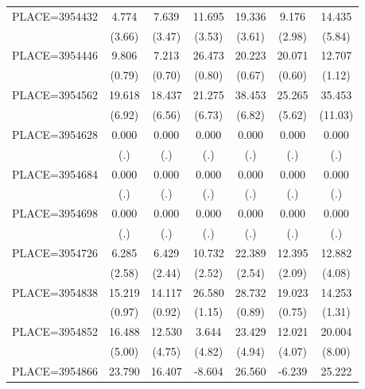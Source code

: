 {\begin{tabular}{l*{6}{c}}
PLACE=3954432       &       4.774&       7.639&      11.695&      19.336&       9.176&      14.435\\
                    &      (3.66)&      (3.47)&      (3.53)&      (3.61)&      (2.98)&      (5.84)\\
PLACE=3954446       &       9.806&       7.213&      26.473&      20.223&      20.071&      12.707\\
                    &      (0.79)&      (0.70)&      (0.80)&      (0.67)&      (0.60)&      (1.12)\\
PLACE=3954562       &      19.618&      18.437&      21.275&      38.453&      25.265&      35.453\\
                    &      (6.92)&      (6.56)&      (6.73)&      (6.82)&      (5.62)&     (11.03)\\
PLACE=3954628       &       0.000&       0.000&       0.000&       0.000&       0.000&       0.000\\
                    &         (.)&         (.)&         (.)&         (.)&         (.)&         (.)\\
PLACE=3954684       &       0.000&       0.000&       0.000&       0.000&       0.000&       0.000\\
                    &         (.)&         (.)&         (.)&         (.)&         (.)&         (.)\\
PLACE=3954698       &       0.000&       0.000&       0.000&       0.000&       0.000&       0.000\\
                    &         (.)&         (.)&         (.)&         (.)&         (.)&         (.)\\
PLACE=3954726       &       6.285&       6.429&      10.732&      22.389&      12.395&      12.882\\
                    &      (2.58)&      (2.44)&      (2.52)&      (2.54)&      (2.09)&      (4.08)\\
PLACE=3954838       &      15.219&      14.117&      26.580&      28.732&      19.023&      14.253\\
                    &      (0.97)&      (0.92)&      (1.15)&      (0.89)&      (0.75)&      (1.31)\\
PLACE=3954852       &      16.488&      12.530&       3.644&      23.429&      12.021&      20.004\\
                    &      (5.00)&      (4.75)&      (4.82)&      (4.94)&      (4.07)&      (8.00)\\
PLACE=3954866       &      23.790&      16.407&      -8.604&      26.560&      -6.239&      25.222\\

\end{tabular}}
